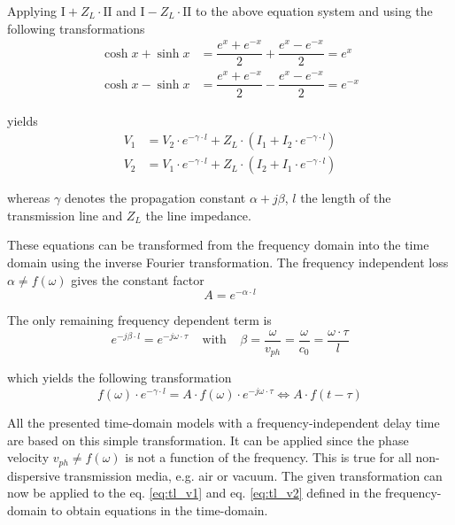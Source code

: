 Applying $\textrm{I} + Z_L\cdot \textrm{II}$ and $\textrm{I} -
Z_L\cdot \textrm{II}$ to the above equation system and using the
following transformations
\begin{align}
\cosh{x} + \sinh{x} &= \dfrac{e^x + e^{-x}}{2} + \dfrac{e^x - e^{-x}}{2} = e^x\\
\cosh{x} - \sinh{x} &= \dfrac{e^x + e^{-x}}{2} - \dfrac{e^x - e^{-x}}{2} = e^{-x}
\end{align}

yields
\begin{align}
\label{eq:tl_v1}
V_1 &= V_2\cdot e^{-\gamma\cdot l} + Z_L\cdot \left(I_1 + I_2\cdot e^{-\gamma\cdot l}\right)\\
\label{eq:tl_v2}
V_2 &= V_1\cdot e^{-\gamma\cdot l} + Z_L\cdot \left(I_2 + I_1\cdot e^{-\gamma\cdot l}\right)
\end{align}

whereas $\gamma$ denotes the propagation constant $\alpha + j\beta$,
$l$ the length of the transmission line and $Z_L$ the line impedance.

\addvspace{12pt}

These equations can be transformed from the frequency domain into the
time domain using the inverse Fourier transformation.  The frequency
independent loss $\alpha \ne f\left(\omega\right)$ gives the constant
factor
\begin{equation}
A = e^{-\alpha\cdot l}
\end{equation}

The only remaining frequency dependent term is
\begin{equation}
e^{-j\beta\cdot l} = e^{-j\omega\cdot\tau}
\;\;\;\; \textrm{with} \;\;\;\;
\beta = \dfrac{\omega}{v_{ph}} = \dfrac{\omega}{c_0} = \dfrac{\omega\cdot \tau}{l}
\end{equation}

which yields the following transformation
\begin{equation}
f\left(\omega\right)\cdot e^{-\gamma\cdot l} =
A\cdot f\left(\omega\right)\cdot e^{-j\omega\cdot\tau}
\Longleftrightarrow
A\cdot f\left(t - \tau\right)
\end{equation}

All the presented time-domain models with a frequency-independent
delay time are based on this simple transformation.  It can be applied
since the phase velocity $v_{ph} \ne f\left(\omega\right)$ is not a
function of the frequency.  This is true for all non-dispersive
transmission media, e.g. air or vacuum.  The given transformation can
now be applied to the eq. \eqref{eq:tl_v1} and eq. \eqref{eq:tl_v2}
defined in the frequency-domain to obtain equations in the
time-domain.

